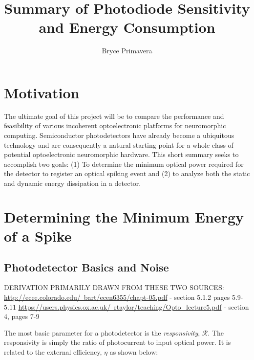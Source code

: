 \documentclass[12pt]{article}
\begin{document}
 
 
\title{Summary of Photodiode Sensitivity and Energy Consumption}
\author{Bryce Primavera}

\maketitle
\section{Motivation}
\quad The ultimate goal of this project will be to compare the performance and feasibility of various incoherent optoelectronic platforms for neuromorphic computing. Semiconductor photodetectors have already become a ubiquitous technology and are consequently a natural starting point for a whole class of potential optoelectronic neuromorphic hardware. This short summary seeks to accomplish two goals: (1) To determine the minimum optical power required for the detector to register an optical spiking event and (2) to analyze both the static and dynamic energy dissipation in a detector.

\section{Determining the Minimum Energy of a Spike}

\subsection{Photodetector Basics and Noise}
\quad DERIVATION PRIMARILY DRAWN FROM THESE TWO SOURCES:
\newline
\hyperlink{http://ecee.colorado.edu/~bart/ecen6355/chapt-05.pdf}{http://ecee.colorado.edu/~bart/ecen6355/chapt-05.pdf} - section 5.1.2 pages 5.9-5.11
\newline
\hyperlink{https://users.physics.ox.ac.uk/~rtaylor/teaching/Opto_lecture5.pdf}{https://users.physics.ox.ac.uk/~rtaylor/teaching/Opto_lecture5.pdf} - section 4, pages 7-9
\newline

\quad The most basic parameter for a photodetector is the \textit{responsivity}, $\mathcal{R}$. The responsivity is simply the ratio of photocurrent to input optical power. It is related to the external efficiency, $\eta$ as shown below:
\end{document}
